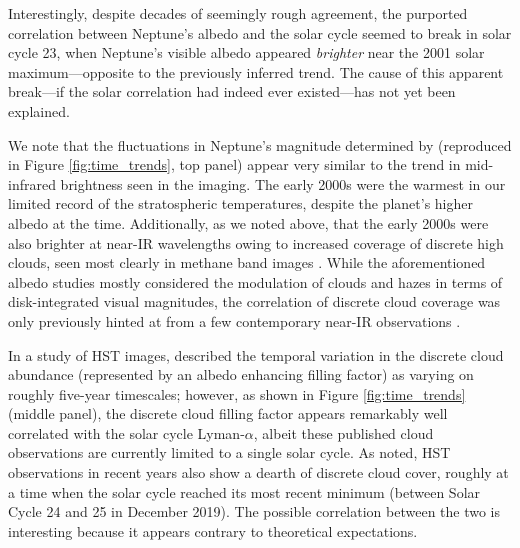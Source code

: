 \documentclass[twocolumn,10pt]{aastex631}
\begin{document}
Interestingly, despite decades of seemingly rough agreement, the purported correlation between Neptune's albedo and the solar cycle seemed to break in solar cycle 23, when Neptune's visible albedo appeared \emph{brighter} near the 2001 solar maximum---opposite to the previously inferred trend. The cause of this apparent break---if the solar correlation had indeed ever existed---has not yet been explained. 

We note that the fluctuations in Neptune's magnitude determined by \citet{aplin2016determining} (reproduced in Figure \ref{fig:time_trends}, top panel) appear very similar to the trend in mid-infrared brightness seen in the imaging. The early 2000s were the warmest in our limited record of the stratospheric temperatures, despite the planet's higher albedo at the time.  Additionally, as we noted above, that the early 2000s were also brighter at near-IR wavelengths owing to increased coverage of discrete high clouds, seen most clearly in methane band images \citep{karkoschka2011neptune, Roman2013DPS}. While the aforementioned albedo studies \citep{lockwood2006photometric,aplin2017solar,lockwood2019final} mostly considered the modulation of clouds and hazes in terms of disk-integrated visual magnitudes, the correlation of discrete cloud coverage was only previously hinted at from a few contemporary near-IR observations \citep{lockwood2002photometric}. 

In a study of HST images, \citet{karkoschka2011neptune} described the temporal variation in the discrete cloud abundance (represented by an albedo enhancing filling factor) as varying on roughly five-year timescales; however, as shown in Figure \ref{fig:time_trends} (middle panel), the discrete cloud filling factor appears remarkably well correlated with the solar cycle Lyman-$\alpha$, albeit these published cloud observations are currently limited to a single solar cycle. As noted, HST observations in recent years also show a dearth of discrete cloud cover, roughly at a time when the solar cycle reached its most recent minimum (between Solar Cycle 24 and 25 in December 2019). The possible correlation between the two is interesting because it appears contrary to theoretical expectations.   
\end{document}
